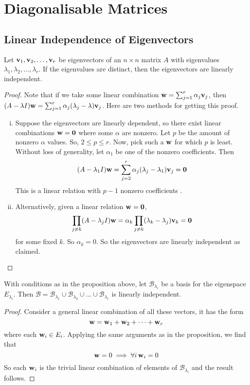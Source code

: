 \documentclass{article}
\begin{document}
\section{Diagonalisable Matrices}
\subsection{Linear Independence of Eigenvectors}
\begin{proposition}
	Let $\vb v_1, \vb v_2, \dots, \vb v_r$ be eigenvectors of an $n\times n$ matrix $A$ with eigenvalues $\lambda_1, \lambda_2,\dots,\lambda_r$. If the eigenvalues are distinct, then the eigenvectors are linearly independent.
\end{proposition}
\begin{proof}
	Note that if we take some linear combination $\vb w = \sum_{j=1}^r \alpha_j\vb v_j$, then $(A - \lambda I)\vb w = \sum_{j=1}^r \alpha_j(\lambda_j - \lambda)\vb v_j$. Here are two methods for getting this proof.
	\begin{enumerate}[(i)]
		\item Suppose the eigenvectors are linearly dependent, so there exist linear combinations $\vb w = \vb 0$ where some $\alpha$ are nonzero. Let $p$ be the amount of nonzero $\alpha$ values. So, $2 \leq p \leq r$. Now, pick such a $\vb w$ for which $p$ is least. Without loss of generality, let $\alpha_1$ be one of the nonzero coefficients. Then
		      \[ (A - \lambda_1 I)\vb w = \sum_{j=2}^r \alpha_j(\lambda_j - \lambda_1)\vb v_j = \vb 0 \]
		      This is a linear relation with $p-1$ nonzero coefficients \contradiction.
		\item Alternatively, given a linear relation $\vb w=\vb 0$,
		      \[ \prod_{j \neq k} (A - \lambda_j I) \vb w = \alpha_k \prod_{j \neq k} (\lambda_k - \lambda_j) \vb v_k = \vb 0 \]
		      for some fixed $k$. So $\alpha_k = 0$. So the eigenvectors are linearly independent as claimed.
	\end{enumerate}
\end{proof}
\begin{corollary}
	With conditions as in the proposition above, let $\mathcal B_{\lambda_i}$ be a basis for the eigenspace $E_{\lambda_i}$. Then $\mathcal B = \mathcal B_{\lambda_1} \cup \mathcal B_{\lambda_2} \cup \dots \cup \mathcal B_{\lambda_r}$ is linearly independent.
\end{corollary}
\begin{proof}
	Consider a general linear combination of all these vectors, it has the form
	\[ \vb w = \vb w_1 + \vb w_2 + \dots + \vb w_r \]
	where each $\vb w_i \in E_i$. Applying the same arguments as in the proposition, we find that
	\[ \vb w = 0 \implies \forall i\,\vb w_i = 0 \]
	So each $\vb w_i$ is the trivial linear combination of elements of $\mathcal B_{\lambda_i}$ and the result follows.
\end{proof}
\end{document}
